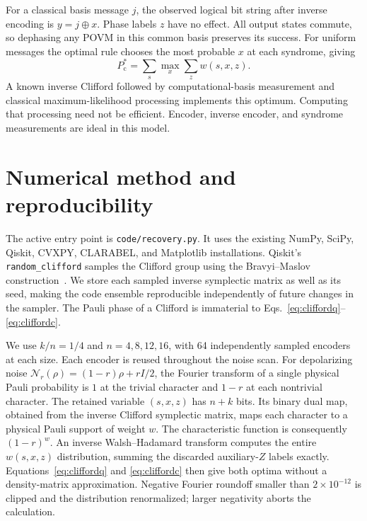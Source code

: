 \documentclass[aps,prl,onecolumn,superscriptaddress,amsmath,amssymb]{revtex4-2}
\newcommand{\N}{\mathcal N}
\newcommand{\Pc}{P_{\mathrm c}^{*}}
\begin{document}
For a classical basis message $j$, the observed logical bit string after inverse encoding is $y=j\oplus x$. Phase labels $z$ have no effect. All output states commute, so dephasing any POVM in this common basis preserves its success. For uniform messages the optimal rule chooses the most probable $x$ at each syndrome, giving
\begin{equation}
\Pc=\sum_s\max_x\sum_z w(s,x,z).
\label{eq:cliffordc}
\end{equation}
A known inverse Clifford followed by computational-basis measurement and classical maximum-likelihood processing implements this optimum. Computing that processing need not be efficient. Encoder, inverse encoder, and syndrome measurements are ideal in this model.

\section{Numerical method and reproducibility}

The active entry point is \texttt{code/recovery.py}. It uses the existing NumPy, SciPy, Qiskit, CVXPY, CLARABEL, and Matplotlib installations. Qiskit's \texttt{random\_clifford} samples the Clifford group using the Bravyi--Maslov construction~\cite{BravyiMaslov}. We store each sampled inverse symplectic matrix as well as its seed, making the code ensemble reproducible independently of future changes in the sampler. The Pauli phase of a Clifford is immaterial to Eqs.~\eqref{eq:cliffordq}--\eqref{eq:cliffordc}.

We use $k/n=1/4$ and $n=4,8,12,16$, with 64 independently sampled encoders at each size. Each encoder is reused throughout the noise scan. For depolarizing noise $\N_r(\rho)=(1-r)\rho+rI/2$, the Fourier transform of a single physical Pauli probability is $1$ at the trivial character and $1-r$ at each nontrivial character. The retained variable $(s,x,z)$ has $n+k$ bits. Its binary dual map, obtained from the inverse Clifford symplectic matrix, maps each character to a physical Pauli support of weight $w$. The characteristic function is consequently $(1-r)^w$. An inverse Walsh--Hadamard transform computes the entire $w(s,x,z)$ distribution, summing the discarded auxiliary-$Z$ labels exactly. Equations~\eqref{eq:cliffordq} and \eqref{eq:cliffordc} then give both optima without a density-matrix approximation. Negative Fourier roundoff smaller than $2\times10^{-12}$ is clipped and the distribution renormalized; larger negativity aborts the calculation.
\end{document}
